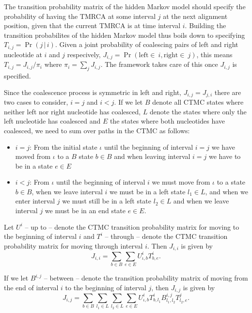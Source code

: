 \documentclass[11pt]{article}
\begin{document}
The transition probability matrix of the hidden Markov model should specify the probability of having the TMRCA at some interval $j$ at the next alignment position, given that the current TMRCA is at time interval $i$. Building the transition probabilites of the hidden Markov model thus boils down to specifying $T_{i,j} = \Pr(j\,|\,i)$. Given a joint probability of coalescing pairs of left and right nucleotide at $i$ and $j$ respecively, $J_{i,j} = \Pr(\mathrm{left}\in~i, \mathrm{right}\in~j)$, this means $T_{i,j}=J_{i,j}/\pi_i$ where $\pi_i=\sum_j J_{i,j}$. The framework takes care of this once $J_{i,j}$ is specified.

Since the coalescence process is symmetric in left and right, $J_{i,j}=J_{j,i}$ there are two cases to consider, $i=j$ and $i<j$. If we let $B$ denote all CTMC states where neither left nor right nucleotide has coalesced, $L$ denote the states where only the left nucleotide has coalesced and $E$ the states where both nucleotides have coalesced, we need to sum over paths in the CTMC as follows:

\begin{itemize}
\item $i=j$: From the initial state $\iota$ until the beginning of interval $i=j$ we have moved from $\iota$ to a $B$ state $b\in B$ and when leaving interval $i=j$ we have to be in a state $e\in E$

\item $i<j$: From $\iota$ until the beginning of interval $i$ we must move from $\iota$ to a state $b\in B$, when we leave interval $i$ we must be in a left state $l_1\in L$, and when we enter interval $j$ we must still be in a left state $l_2\in L$ and when we leave interval $j$ we must be in an end state $e\in E$.
\end{itemize}

Let $U^i$ -- up to -- denote the CTMC transition probability matrix for moving to the beginning of interval $i$ and $T^i$ -- through -- denote the CTMC transition probability matrix for moving through interval $i$. Then $J_{i,i}$ is given by
\[
    J_{i,i} = \sum_{b \in B} \sum_{e\in E} U^i_{\iota,b} T^i_{b,e}.
\]

If we let $B^{i,j}$ -- between -- denote the transition probability matrix of moving from the end of interval $i$ to the beginning of interval $j$, then $J_{i,j}$ is given by
\[
    J_{i,j} = \sum_{b \in B} \sum_{l_1 \in L} \sum_{l_2\in L} \sum_{e \in E}
        U^i_{\iota,b} T^i_{b,l_1} B^{i,j}_{l_1,l_2} T^j_{l_2,e}.
\]
\end{document}
